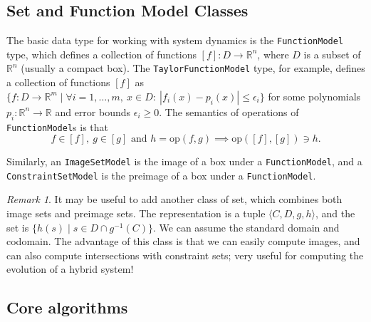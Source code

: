 \documentclass[english,a4paper]{article}
\newcommand{\R}{\mathbb{R}}
\theoremstyle{theorem}
\theoremstyle{definition}
\theoremstyle{remark}
\newtheorem*{remark*}{Remark}
\begin{document}
\subsection{Set and Function Model Classes}

The basic data type for working with system dynamics is the \texttt{FunctionModel} type, which defines a collection of functions $[f]:D\rightarrow \R^n$, where $D$ is a subset of $\R^n$ (usually a compact box). The \texttt{TaylorFunctionModel} type, for example, defines a collection of functions $[f]$ as $\{ f:D\rightarrow\R^m \mid \forall i=1,\ldots,m,\ x\in D:\ |f_i(x)-p_i(x)| \leq \epsilon_i\}$ for some polynomials $p_i:\R^n\rightarrow\R$ and error bounds $\epsilon_i\geq0$. The semantics of operations of \texttt{FunctionModel}s is that
$$ f\in[f],\ g\in[g]  \text{ and } h=\mathrm{op}(f,g) \implies \mathrm{op}([f],[g])\ni h . $$

Similarly, an \texttt{ImageSetModel} is the image of a box under a \texttt{FunctionModel}, and a \texttt{ConstraintSetModel} is the preimage of a box under a \texttt{FunctionModel}.

\begin{remark*} It may be useful to add another class of set, which combines both image sets and preimage sets.
The representation is a tuple $\langle C,D,g,h \rangle$, and the set is $\{ h(s) \mid s\in D\cap g^{-1}(C)\}$. We can assume the standard domain and codomain. The advantage of this class is that we can easily compute images, and can also compute intersections with constraint sets; very useful for computing the evolution of a hybrid system!
\end{remark*}

\subsection{Core algorithms}
\end{document}
